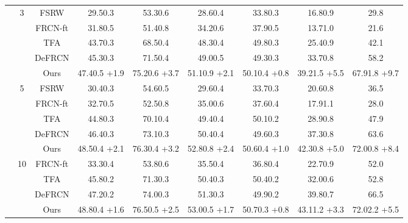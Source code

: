 \documentclass{article}
\begin{document}
\begin{table}[hbt!]
\begin{adjustbox}{width=0.79\textwidth}
{\begin{tabular}{c|c|c|ccc|c|cc}
         &\multirow{5}{*}{3}&FSRW \cite{metayolo} & 29.50.3&53.30.6&28.60.4&33.80.3&16.80.9&29.8 \\
         &&FRCN-ft \cite{metarcnn}&31.80.5&51.40.8&34.20.6&37.90.5&13.71.0&21.6\\
         &&TFA \cite{tfa}&43.70.3&68.50.4&48.30.4&49.80.3&25.40.9&42.1\\
         &&DeFRCN \cite{defrcn}&45.30.3&71.50.4&49.00.5&49.30.3&33.70.8&58.2\\
         && \cellcolor{gray!30}Ours&\cellcolor{gray!30}47.40.5 {\scriptsize \color{red}+1.9}&\cellcolor{gray!30}75.20.6 {\scriptsize \color{red}+3.7}&\cellcolor{gray!30}51.10.9 {\scriptsize \color{red}+2.1}&\cellcolor{gray!30}50.10.4 {\scriptsize \color{red}+0.8}&\cellcolor{gray!30}39.21.5 {\scriptsize \color{red}+5.5}&\cellcolor{gray!30}67.91.8 {\scriptsize \color{red}+9.7}\\
         \cmidrule{2-9}
         &\multirow{5}{*}{5}&FSRW \cite{metayolo} & 30.40.3&54.60.5&29.60.4&33.70.3&20.60.8&36.5 \\
         &&FRCN-ft \cite{metarcnn}&32.70.5&52.50.8&35.00.6&37.60.4&17.91.1&28.0\\
         &&TFA \cite{tfa}&44.80.3&70.10.4&49.40.4&50.10.2&28.90.8&47.9\\
         &&DeFRCN \cite{defrcn}&46.40.3&73.10.3&50.40.4&49.60.3&37.30.8&63.6\\
         && \cellcolor{gray!30}Ours&\cellcolor{gray!30}48.50.4 {\scriptsize \color{red}+2.1}&\cellcolor{gray!30}76.30.4 {\scriptsize \color{red}+3.2}&\cellcolor{gray!30}52.80.8 {\scriptsize \color{red}+2.4}&\cellcolor{gray!30}50.60.4 {\scriptsize \color{red}+1.0}&\cellcolor{gray!30}42.30.8 {\scriptsize \color{red}+5.0}&\cellcolor{gray!30}72.00.8 {\scriptsize \color{red}+8.4}\\
         \cmidrule{2-9}
         &\multirow{5}{*}{10}& FRCN-ft \cite{metarcnn}&33.30.4&53.80.6&35.50.4&36.80.4&22.70.9&52.0 \\
         &&TFA \cite{tfa}&45.80.2&71.30.3&50.40.3&50.40.2&32.00.6&52.8\\
         &&DeFRCN \cite{defrcn}&47.20.2&74.00.3&51.30.3&49.90.2&39.80.7&66.5\\
         && \cellcolor{gray!30}Ours&\cellcolor{gray!30}48.80.4 {\scriptsize \color{red}+1.6}&\cellcolor{gray!30}76.50.5 {\scriptsize \color{red}+2.5}&\cellcolor{gray!30}53.00.5 {\scriptsize \color{red}+1.7}&\cellcolor{gray!30}50.70.3 {\scriptsize \color{red}+0.8}&\cellcolor{gray!30}43.11.2 {\scriptsize \color{red}+3.3}&\cellcolor{gray!30}72.02.2 {\scriptsize \color{red}+5.5}\\

\end{tabular}}
\end{adjustbox}
\end{table}
\end{document}

